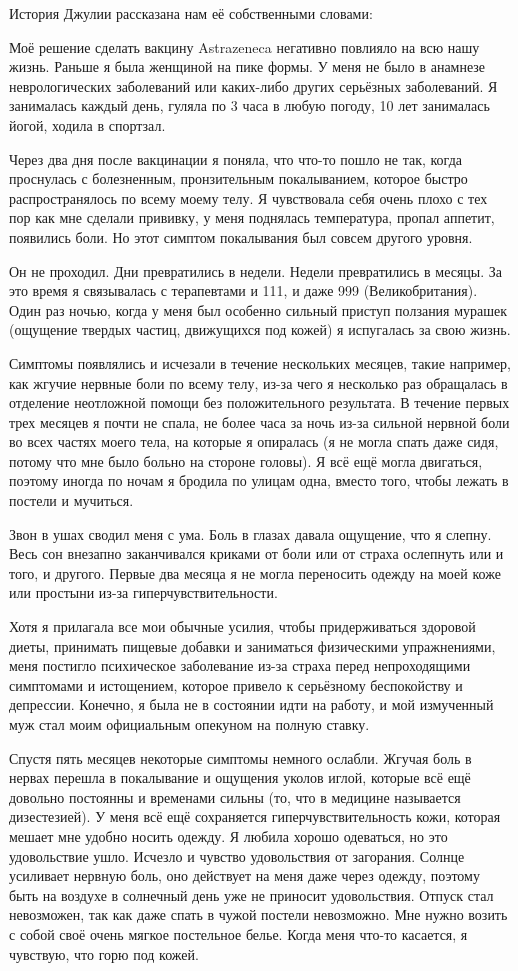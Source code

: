 История Джулии рассказана нам её собственными словами:

Моё решение сделать вакцину Astrazeneca негативно повлияло на всю нашу
жизнь. Раньше я была женщиной на пике формы. У меня не было в анамнезе
неврологических заболеваний или каких-либо других серьёзных заболеваний. Я
занималась каждый день, гуляла по 3 часа в любую погоду, 10 лет занималась
йогой, ходила в спортзал.

Через два дня после вакцинации я поняла, что что-то пошло не так, когда
проснулась с болезненным, пронзительным покалыванием, которое быстро
распространялось по всему моему телу. Я чувствовала себя очень плохо с тех пор
как мне сделали прививку, у меня поднялась температура, пропал аппетит,
появились боли. Но этот симптом покалывания был совсем другого уровня.

Он не проходил. Дни превратились в недели. Недели превратились в месяцы. За это
время я связывалась с терапевтами и 111, и даже 999 (Великобритания). Один раз
ночью, когда у меня был особенно сильный приступ ползания мурашек (ощущение
твердых частиц, движущихся под кожей) я испугалась за свою жизнь.

Симптомы появлялись и исчезали в течение нескольких месяцев, такие например, как
жгучие нервные боли по всему телу, из-за чего я несколько раз обращалась в
отделение неотложной помощи без положительного результата. В течение первых трех
месяцев я почти не спала, не более часа за ночь из-за сильной нервной боли во
всех частях моего тела, на которые я опиралась (я не могла спать даже сидя,
потому что мне было больно на стороне головы). Я всё ещё могла двигаться,
поэтому иногда по ночам я бродила по улицам одна, вместо того, чтобы лежать в
постели и мучиться.

Звон в ушах сводил меня с ума. Боль в глазах давала ощущение, что я слепну. Весь
сон внезапно заканчивался криками от боли или от страха ослепнуть или и того, и
другого. Первые два месяца я не могла переносить одежду на моей коже или
простыни из-за гиперчувствительности.

Хотя я прилагала все мои обычные усилия, чтобы придерживаться здоровой диеты,
принимать пищевые добавки и заниматься физическими упражнениями, меня постигло
психическое заболевание из-за страха перед непроходящими симптомами и
истощением, которое привело к серьёзному беспокойству и депрессии. Конечно, я
была не в состоянии идти на работу, и мой измученный муж стал моим официальным
опекуном на полную ставку.

Спустя пять месяцев некоторые симптомы немного ослабли. Жгучая боль в нервах
перешла в покалывание и ощущения уколов иглой, которые всё ещё довольно
постоянны и временами сильны (то, что в медицине называется дизестезией). У меня
всё ещё сохраняется гиперчувствительность кожи, которая мешает мне удобно носить
одежду. Я любила хорошо одеваться, но это удовольствие ушло. Исчезло и чувство
удовольствия от загорания. Солнце усиливает нервную боль, оно действует на меня
даже через одежду, поэтому быть на воздухе в солнечный день уже не приносит
удовольствия. Отпуск стал невозможен, так как даже спать в чужой постели
невозможно. Мне нужно возить с собой своё очень мягкое постельное белье. Когда
меня что-то касается, я чувствую, что горю под кожей.

